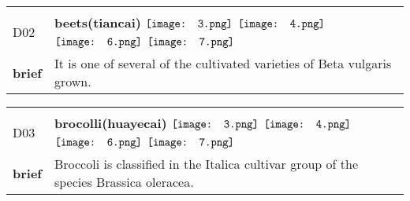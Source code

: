 \documentclass[UTF8]{article}
\begin{document}
            \begin{tabularx}{\textwidth}{p{1.5cm}X}
            \arrayrulecolor{myBlue}
        	\hline\\
            \small{D02}&
            \large{\bfseries{beets(tiancai)}}\hfill
                                                \phantom{$\vcenter{\hbox{\texttt{[image: 1.png]}}}$}
                                                                \phantom{$\vcenter{\hbox{\texttt{[image: 2.png]}}}$}
                                                                $\vcenter{\hbox{\texttt{[image: 3.png]}}}$
                                                                $\vcenter{\hbox{\texttt{[image: 4.png]}}}$
                                                                \phantom{$\vcenter{\hbox{\texttt{[image: 5.png]}}}$}
                                                                $\vcenter{\hbox{\texttt{[image: 6.png]}}}$
                                                                $\vcenter{\hbox{\texttt{[image: 7.png]}}}$
                                        \\[10pt]
            \large{\bfseries{brief}}&\noindent\parbox[c]{\hsize}{It is one of several of the cultivated varieties of Beta vulgaris grown. } \\[5pt]
            \hline\\[-10pt]
        \end{tabularx}
            \begin{tabularx}{\textwidth}{p{1.5cm}X}
            \arrayrulecolor{myBlue}
        	\hline\\
            \small{D03}&
            \large{\bfseries{brocolli(huayecai)}}\hfill
                                                \phantom{$\vcenter{\hbox{\texttt{[image: 1.png]}}}$}
                                                                \phantom{$\vcenter{\hbox{\texttt{[image: 2.png]}}}$}
                                                                $\vcenter{\hbox{\texttt{[image: 3.png]}}}$
                                                                $\vcenter{\hbox{\texttt{[image: 4.png]}}}$
                                                                \phantom{$\vcenter{\hbox{\texttt{[image: 5.png]}}}$}
                                                                $\vcenter{\hbox{\texttt{[image: 6.png]}}}$
                                                                $\vcenter{\hbox{\texttt{[image: 7.png]}}}$
                                        \\[10pt]
            \large{\bfseries{brief}}&\noindent\parbox[c]{\hsize}{Broccoli is classified in the Italica cultivar group of the species Brassica oleracea.} \\[5pt]
            \hline\\[-10pt]
        \end{tabularx}
\end{document}
